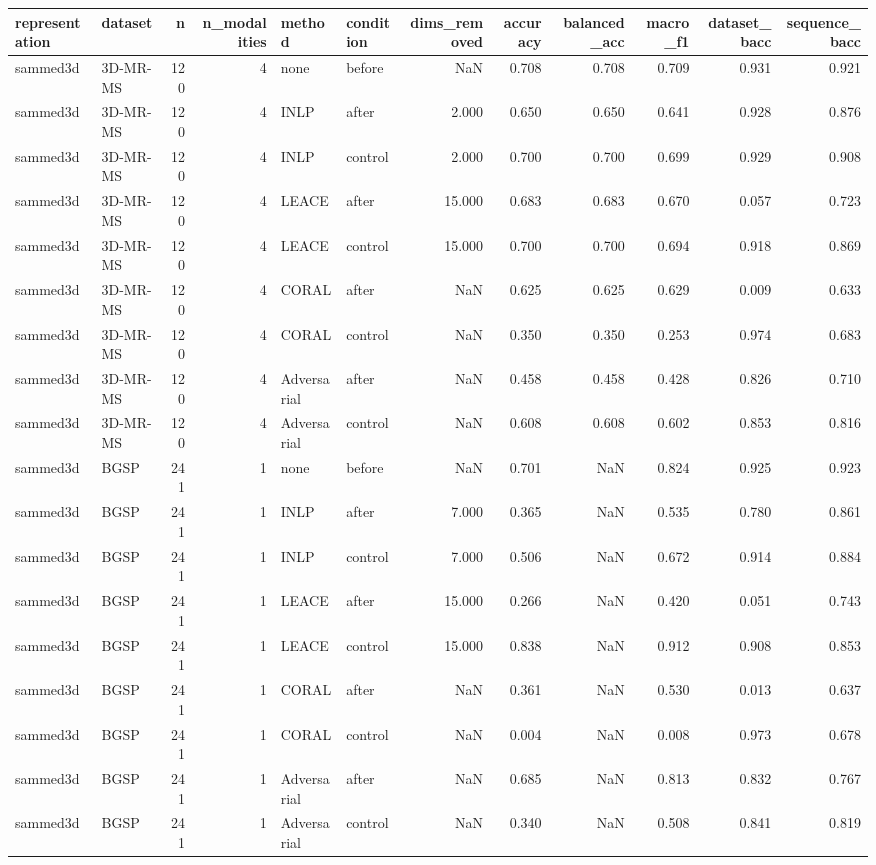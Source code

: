 \begin{tabular}{llrrllrrrrrr}
\toprule
representation & dataset & n & n\_modalities & method & condition & dims\_removed & accuracy & balanced\_acc & macro\_f1 & dataset\_bacc & sequence\_bacc \\
\midrule
sammed3d & 3D-MR-MS & 120 & 4 & none & before & NaN & 0.708 & 0.708 & 0.709 & 0.931 & 0.921 \\
sammed3d & 3D-MR-MS & 120 & 4 & INLP & after & 2.000 & 0.650 & 0.650 & 0.641 & 0.928 & 0.876 \\
sammed3d & 3D-MR-MS & 120 & 4 & INLP & control & 2.000 & 0.700 & 0.700 & 0.699 & 0.929 & 0.908 \\
sammed3d & 3D-MR-MS & 120 & 4 & LEACE & after & 15.000 & 0.683 & 0.683 & 0.670 & 0.057 & 0.723 \\
sammed3d & 3D-MR-MS & 120 & 4 & LEACE & control & 15.000 & 0.700 & 0.700 & 0.694 & 0.918 & 0.869 \\
sammed3d & 3D-MR-MS & 120 & 4 & CORAL & after & NaN & 0.625 & 0.625 & 0.629 & 0.009 & 0.633 \\
sammed3d & 3D-MR-MS & 120 & 4 & CORAL & control & NaN & 0.350 & 0.350 & 0.253 & 0.974 & 0.683 \\
sammed3d & 3D-MR-MS & 120 & 4 & Adversarial & after & NaN & 0.458 & 0.458 & 0.428 & 0.826 & 0.710 \\
sammed3d & 3D-MR-MS & 120 & 4 & Adversarial & control & NaN & 0.608 & 0.608 & 0.602 & 0.853 & 0.816 \\
sammed3d & BGSP & 241 & 1 & none & before & NaN & 0.701 & NaN & 0.824 & 0.925 & 0.923 \\
sammed3d & BGSP & 241 & 1 & INLP & after & 7.000 & 0.365 & NaN & 0.535 & 0.780 & 0.861 \\
sammed3d & BGSP & 241 & 1 & INLP & control & 7.000 & 0.506 & NaN & 0.672 & 0.914 & 0.884 \\
sammed3d & BGSP & 241 & 1 & LEACE & after & 15.000 & 0.266 & NaN & 0.420 & 0.051 & 0.743 \\
sammed3d & BGSP & 241 & 1 & LEACE & control & 15.000 & 0.838 & NaN & 0.912 & 0.908 & 0.853 \\
sammed3d & BGSP & 241 & 1 & CORAL & after & NaN & 0.361 & NaN & 0.530 & 0.013 & 0.637 \\
sammed3d & BGSP & 241 & 1 & CORAL & control & NaN & 0.004 & NaN & 0.008 & 0.973 & 0.678 \\
sammed3d & BGSP & 241 & 1 & Adversarial & after & NaN & 0.685 & NaN & 0.813 & 0.832 & 0.767 \\
sammed3d & BGSP & 241 & 1 & Adversarial & control & NaN & 0.340 & NaN & 0.508 & 0.841 & 0.819 \\

\end{tabular}
